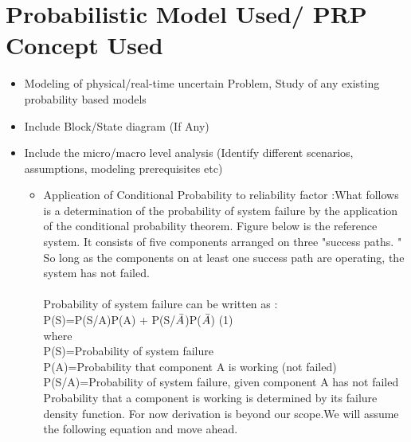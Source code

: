 \documentclass{article}
\begin{document}
\section {Probabilistic Model Used/ PRP Concept Used}
\begin{itemize}

\item Modeling of physical/real-time uncertain Problem, Study of any existing probability based models
\item Include Block/State diagram (If Any)
\item Include the micro/macro level analysis (Identify different scenarios, assumptions, modeling prerequisites etc)
 \begin{itemize}
     \item Application of Conditional Probability to reliability factor :What
follows is a determination of the probability of system failure by the
application of the conditional probability theorem. Figure below is the reference system. It consists of five components arranged on three "success paths. " So long as the components on at least one success path are operating, the system has not failed.\\ \\
    Probability of system failure can be written as : \\\vspace{10mm}
    \hspace{50mm}P(S)=P(S/A)P(A) + P(S/$\Bar{A}$)P($\Bar{A}$)\hspace{30mm} (1)\\
    where\\\vspace{2mm}
    \hspace{15mm}P(S)=Probability of system failure\\\vspace{2mm}
    \hspace{15mm}P(A)=Probability that component A is working (not failed)\\\vspace{2mm}
    \hspace{15mm}P(S/A)=Probability of system failure, given component A has not failed\\\vspace{2mm}
    Probability that a component is working is determined by its failure density function. For now derivation is beyond our scope.We will assume the following equation and move ahead. 

\end{itemize}
\end{itemize}
\end{document}
